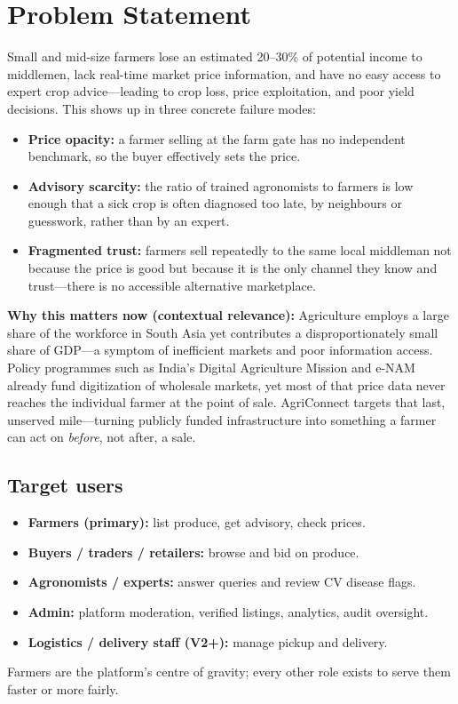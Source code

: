 \documentclass[11pt,a4paper]{article}
\begin{document}
\section{Problem Statement}
Small and mid-size farmers lose an estimated 20--30\% of potential income to middlemen, lack real-time market price information, and have no easy access to expert crop advice---leading to crop loss, price exploitation, and poor yield decisions. This shows up in three concrete failure modes:
\begin{itemize}[leftmargin=0.7cm]
    \item \textbf{Price opacity:} a farmer selling at the farm gate has no independent benchmark, so the buyer effectively sets the price.
    \item \textbf{Advisory scarcity:} the ratio of trained agronomists to farmers is low enough that a sick crop is often diagnosed too late, by neighbours or guesswork, rather than by an expert.
    \item \textbf{Fragmented trust:} farmers sell repeatedly to the same local middleman not because the price is good but because it is the only channel they know and trust---there is no accessible alternative marketplace.
\end{itemize}

\textbf{Why this matters now (contextual relevance):} Agriculture employs a large share of the workforce in South Asia yet contributes a disproportionately small share of GDP---a symptom of inefficient markets and poor information access. Policy programmes such as India's Digital Agriculture Mission and e-NAM already fund digitization of wholesale markets, yet most of that price data never reaches the individual farmer at the point of sale. AgriConnect targets that last, unserved mile---turning publicly funded infrastructure into something a farmer can act on \emph{before}, not after, a sale.

\subsection*{Target users}
\begin{itemize}[leftmargin=0.7cm]
    \item \textbf{Farmers (primary):} list produce, get advisory, check prices.
    \item \textbf{Buyers / traders / retailers:} browse and bid on produce.
    \item \textbf{Agronomists / experts:} answer queries and review CV disease flags.
    \item \textbf{Admin:} platform moderation, verified listings, analytics, audit oversight.
    \item \textbf{Logistics / delivery staff (V2+):} manage pickup and delivery.
\end{itemize}
Farmers are the platform's centre of gravity; every other role exists to serve them faster or more fairly.
\end{document}
